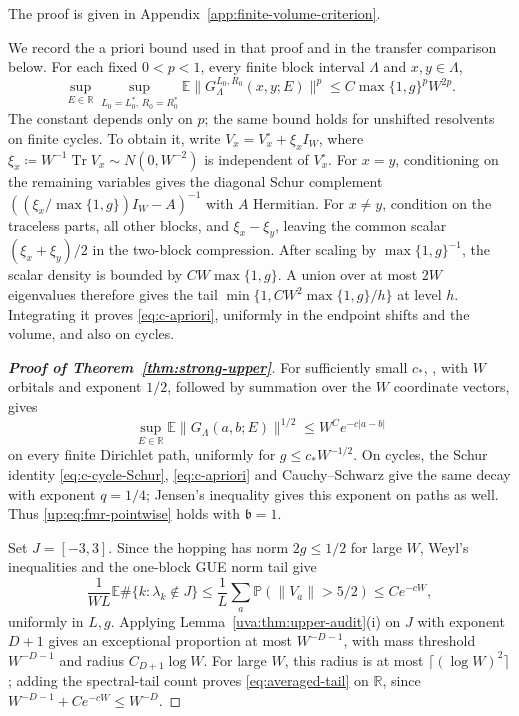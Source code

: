 \documentclass[11pt]{article}
\numberwithin{equation}{section}
\theoremstyle{remark}
\newcommand{\E}{\mathbb E}
\newcommand{\Prob}{\mathbb P}
\newcommand{\R}{\mathbb R}
\newcommand{\Tr}{\operatorname{Tr}}
\begin{document}
The proof is given in Appendix~\ref{app:finite-volume-criterion}.

We record the a priori bound used in that proof and in the transfer
comparison below. For each fixed $0<p<1$, every finite block interval
$\Lambda$ and $x,y\in\Lambda$,
\begin{equation}\label{eq:c-apriori}
 \sup_{E\in\R}\sup_{L_0=L_0^*,\,R_0=R_0^*}
 \E\|G_\Lambda^{L_0,R_0}(x,y;E)\|^p
 \le C\max\{1,g\}^pW^{2p}.
\end{equation}
The constant depends only on $p$; the same bound holds for unshifted
resolvents on finite cycles. To obtain it, write
$V_x=V_x^\circ+\xi_xI_W$, where
$\xi_x\coloneqq W^{-1}\Tr V_x\sim N(0,W^{-2})$ is independent of
$V_x^\circ$. For $x=y$, conditioning on the remaining variables gives
the diagonal Schur complement
$((\xi_x/\max\{1,g\})I_W-A)^{-1}$ with $A$ Hermitian.
For $x\ne y$, condition on the traceless parts, all other blocks, and $\xi_x-\xi_y$,
leaving the common scalar $(\xi_x+\xi_y)/2$ in the two-block compression.
After scaling by $\max\{1,g\}^{-1}$, the scalar density is bounded by
$CW\max\{1,g\}$. A union over at most $2W$ eigenvalues therefore gives
the tail $\min\{1,CW^2\max\{1,g\}/h\}$ at level $h$.
Integrating it proves \eqref{eq:c-apriori}, uniformly in the endpoint
shifts and the volume, and also on cycles.

\begin{proof}[\textbf{Proof of Theorem~\ref{thm:strong-upper}}]
For sufficiently small $c_*$, \cite[Theorem~1]{PSSS}, with $W$
orbitals and exponent $1/2$, followed by summation over the $W$
coordinate vectors, gives
\[
 \sup_{E\in\R}\E\|G_\Lambda(a,b;E)\|^{1/2}
 \le W^C e^{-c|a-b|}
\]
on every finite Dirichlet path, uniformly for $g\le c_*W^{-1/2}$.
On cycles, the Schur identity \eqref{eq:c-cycle-Schur},
\eqref{eq:c-apriori} and Cauchy--Schwarz give the same decay with
exponent $q=1/4$; Jensen's inequality gives this exponent on paths
as well. Thus \eqref{up:eq:fmr-pointwise} holds with $\mathfrak b=1$.

Set $J=[-3,3]$. Since the hopping has norm $2g\le1/2$ for large $W$,
Weyl's inequalities and the one-block GUE norm tail give
\[
 \frac1{WL}\E\#\{k:\lambda_k\notin J\}
 \le\frac1L\sum_a\Prob(\|V_a\|>5/2)\le Ce^{-cW},
\]
uniformly in $L,g$.
Applying Lemma~\ref{uva:thm:upper-audit}\textup{(i)} on $J$ with
exponent $D+1$ gives an exceptional proportion at most $W^{-D-1}$,
with mass threshold $W^{-D-1}$ and radius $C_{D+1}\log W$.
For large $W$, this radius is at most $\lceil(\log W)^2\rceil$;
adding the spectral-tail count proves \eqref{eq:averaged-tail} on
$\R$, since $W^{-D-1}+Ce^{-cW}\le W^{-D}$.
\end{proof}
\end{document}
